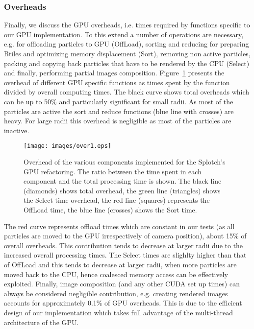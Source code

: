 \documentclass[1p]{elsarticle}
\begin{document}
\subsubsection{Overheads}
\label{sec:overhead}
Finally, we discuss the GPU overheads, i.e. times required by functions specific to our GPU implementation. To this extend a number of operations are necessary, e.g. for offloading particles to GPU (OffLoad), sorting and reducing for preparing Btiles and optimizing memory displacement (Sort), removing non active particles, packing and copying back particles that have to be rendered by the CPU (Select) and finally, performing partial images composition. Figure~\ref{fig:over} presents the overhead of different GPU specific functions as times spent by the function divided by overall computing times. The black curve shows total overheads which can be up to 50\% and particularly significant for small radii. As most of the particles are active the sort and reduce 
functions (blue line with crosses) are heavy. For large radii this overhead is negligible as most of the particles are inactive. 

\begin{figure}
\centering
\texttt{[image: images/over1.eps]}
\caption{Overhead of the various components implemented for the Splotch's
GPU refactoring. The ratio between the time spent in each component and the total processing 
time is shown. The black line (diamonds) shows total overhead, the green line (triangles) shows the Select time overhead, the red line (squares) represents the OffLoad time, the blue line (crosses) shows the Sort time.}
\label{fig:over}
\end{figure}

The red curve represents offload times which are constant in our tests (as all particles are moved to the GPU irrespectively of camera position), about 15\% of overall overheads. This contribution tends to decrease at larger radii due to the increased overall processing times. The Select times are slighlty higher than that of OffLoad and this tends to decrease at larger radii, when more particles are moved back to the CPU, hence coalesced memory access can be effectively exploited. Finally, image composition (and any other CUDA set up times) can always be considered negligible contribution, e.g. creating rendered images accounts for approximately 0.1\% of GPU overheads. This is due to the efficient design of our implementation which takes full advantage of the multi-thread architecture 
of the GPU.
\end{document}
